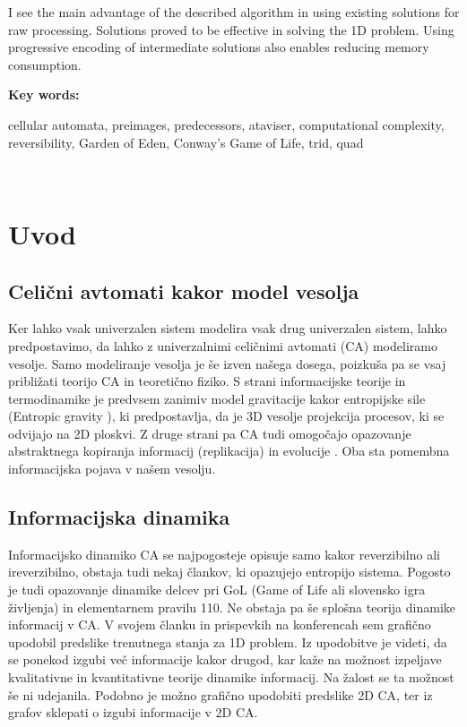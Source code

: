 \documentclass[12pt,a4paper,openany,twoside]{book}
\begin{document}
I see the main advantage of the described algorithm
in using existing solutions for raw processing.
Solutions proved to be effective in solving the 1D problem.
Using progressive encoding of intermediate solutions
also enables reducing memory consumption.

\vspace{1.3cm}
\noindent
{\large \bf Key words:}

\vspace{0.5cm}
\noindent
cellular automata, preimages, predecessors, ataviser, computational complexity, reversibility, Garden of Eden, Conway's Game of Life, trid, quad
\newpage

\ \thispagestyle{empty}
\newpage


\chapter{Uvod}

\section{Celični avtomati kakor model vesolja}

Ker lahko vsak univerzalen sistem modelira vsak drug univerzalen sistem, lahko predpostavimo,
da lahko z univerzalnimi celičnimi avtomati (CA) modeliramo vesolje. Samo modeliranje vesolja
je še izven našega dosega, poizkuša pa se vsaj približati teorijo CA in teoretično fiziko.
S strani informacijske teorije in termodinamike je predvsem zanimiv model gravitacije
kakor entropijske sile (Entropic gravity \cite{Verlinde2010}), ki predpostavlja, da je
3D vesolje projekcija procesov, ki se odvijajo na 2D ploskvi. Z druge strani pa CA tudi omogočajo
opazovanje abstraktnega kopiranja informacij (replikacija) in evolucije \cite{Salzberg2004}.
Oba sta pomembna informacijska pojava v našem vesolju.

\section{Informacijska dinamika}

Informacijsko dinamiko CA se najpogosteje opisuje samo kakor reverzibilno ali ireverzibilno,
obstaja tudi nekaj člankov, ki opazujejo entropijo sistema.
Pogosto je tudi opazovanje dinamike delcev pri GoL (Game of Life ali slovensko igra življenja) in elementarnem pravilu 110.
Ne obstaja pa še splošna teorija dinamike informacij v CA.
V svojem članku \cite{JerasDobnikar2007} in prispevkih na konferencah \cite{DBLP:conf/iccS/JerasD06, DBLP:conf/automata/Jeras08, Jeras2008-pyca}
sem grafično upodobil predslike trenutnega stanja za 1D problem.
Iz upodobitve je videti, da se ponekod izgubi več informacije kakor drugod,
kar kaže na možnost izpeljave kvalitativne in kvantitativne teorije dinamike informacij.
Na žalost se ta možnost še ni udejanila. Podobno je možno grafično upodobiti predslike 2D CA,
ter iz grafov sklepati o izgubi informacije v 2D CA.
\end{document}
